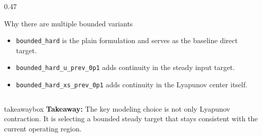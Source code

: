 \documentclass[aspectratio=169]{beamer}
\newcommand{\takeawaybox}[1]{%
\vspace{0.01cm}
\begin{center}
\begin{beamercolorbox}[wd=0.94\textwidth,sep=3pt,center,rounded=true,shadow=false]{takeawaybox}
\scriptsize
\textbf{\textcolor{maroon1}{Takeaway:}} #1
\end{beamercolorbox}
\end{center}
}
\begin{document}
\begin{frame}
\begin{columns}[T,onlytextwidth]
\begin{column}{0.47\textwidth}
\vspace{0.02cm}

\begin{block}{Why there are multiple bounded variants}
\begin{itemize}\justifying
  \setlength{\itemsep}{0.28ex}
  \item \texttt{bounded\_hard} is the plain formulation and serves as the baseline direct target.
  \item \texttt{bounded\_hard\_u\_prev\_0p1} adds continuity in the steady input target.
  \item \texttt{bounded\_hard\_xs\_prev\_0p1} adds continuity in the Lyapunov center itself.
\end{itemize}
\end{block}
\end{column}

\end{columns}

\takeawaybox{The key modeling choice is not only Lyapunov contraction. It is selecting a bounded steady target that stays consistent with the current operating region.}

\end{frame}
\end{document}
